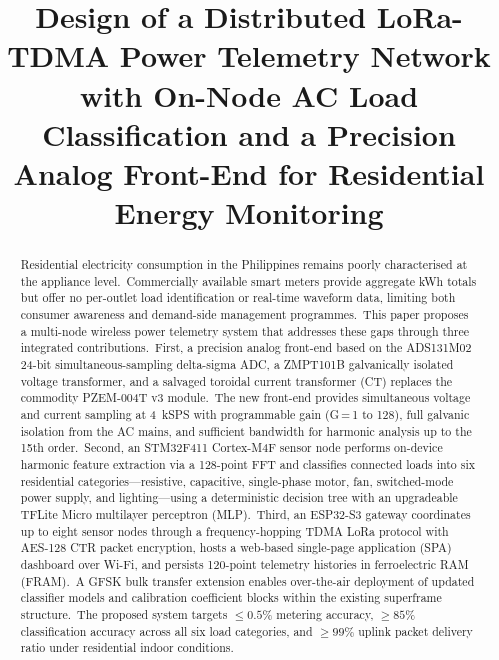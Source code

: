 \documentclass[conference]{IEEEtran}
\begin{document}
\title{Design of a Distributed LoRa-TDMA Power Telemetry Network
       with On-Node AC Load Classification and a Precision Analog
       Front-End for Residential Energy Monitoring}

\author{%
}

\maketitle

\begin{abstract}
Residential electricity consumption in the Philippines remains poorly
characterised at the appliance level.\ Commercially available smart
meters provide aggregate kWh totals but offer no per-outlet load
identification or real-time waveform data, limiting both consumer
awareness and demand-side management programmes.\ This paper proposes
a multi-node wireless power telemetry system that addresses these gaps
through three integrated contributions.\ First, a precision analog
front-end based on the ADS131M02 24-bit simultaneous-sampling
delta-sigma ADC, a ZMPT101B galvanically isolated voltage transformer,
and a salvaged toroidal current transformer (CT) replaces the
commodity PZEM-004T v3 module.\ The new front-end provides
simultaneous voltage and current sampling at 4~kSPS with programmable
gain (G\,=\,1 to 128), full galvanic isolation from the AC mains, and
sufficient bandwidth for harmonic analysis up to the 15th order.\ Second, an
STM32F411 Cortex-M4F sensor node performs on-device harmonic feature
extraction via a 128-point FFT and classifies connected loads into six
residential categories---resistive, capacitive, single-phase motor,
fan, switched-mode power supply, and lighting---using a deterministic
decision tree with an upgradeable TFLite Micro multilayer perceptron
(MLP).\ Third, an ESP32-S3 gateway coordinates up to eight sensor
nodes through a frequency-hopping TDMA LoRa protocol with AES-128 CTR
packet encryption, hosts a web-based single-page application (SPA)
dashboard over Wi-Fi, and persists 120-point telemetry histories in
ferroelectric RAM (FRAM).\ A GFSK bulk transfer extension enables
over-the-air deployment of updated classifier models and calibration
coefficient blocks within the existing superframe structure.\ The
proposed system targets \(\le 0.5\%\) metering accuracy, \(\ge 85\%\)
classification accuracy across all six load categories, and
\(\ge 99\%\) uplink packet delivery ratio under residential indoor
conditions.
\end{abstract}
\end{document}
